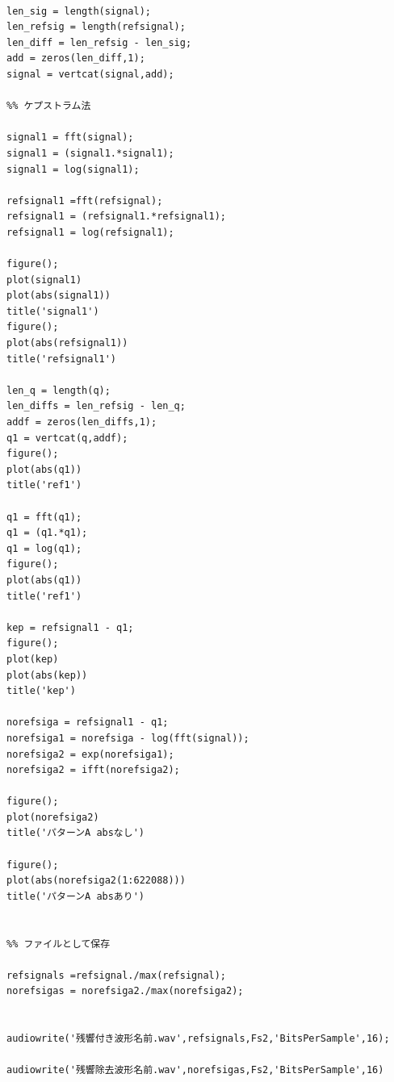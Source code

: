 \documentclass[a4j,11pt]{jsarticle}
\begin{document}
\begin{lstlisting}[caption=残響除去,label=fuga]
%% 波形の長さ揃える

len_sig = length(signal);
len_refsig = length(refsignal);
len_diff = len_refsig - len_sig;
add = zeros(len_diff,1);
signal = vertcat(signal,add);

%% ケプストラム法

signal1 = fft(signal);
signal1 = (signal1.*signal1);
signal1 = log(signal1);

refsignal1 =fft(refsignal);
refsignal1 = (refsignal1.*refsignal1);
refsignal1 = log(refsignal1);

figure();
plot(signal1)
plot(abs(signal1))
title('signal1')
figure();
plot(abs(refsignal1))
title('refsignal1')

len_q = length(q);
len_diffs = len_refsig - len_q;
addf = zeros(len_diffs,1);
q1 = vertcat(q,addf);
figure();
plot(abs(q1))
title('ref1')

q1 = fft(q1);
q1 = (q1.*q1);
q1 = log(q1);
figure();
plot(abs(q1))
title('ref1')

kep = refsignal1 - q1;
figure();
plot(kep)
plot(abs(kep))
title('kep')

norefsiga = refsignal1 - q1;
norefsiga1 = norefsiga - log(fft(signal));
norefsiga2 = exp(norefsiga1);
norefsiga2 = ifft(norefsiga2);

figure();
plot(norefsiga2)
title('パターンA absなし')

figure();
plot(abs(norefsiga2(1:622088)))
title('パターンA absあり')


%% ファイルとして保存

refsignals =refsignal./max(refsignal);
norefsigas = norefsiga2./max(norefsiga2);


audiowrite('残響付き波形名前.wav',refsignals,Fs2,'BitsPerSample',16);

audiowrite('残響除去波形名前.wav',norefsigas,Fs2,'BitsPerSample',16)

\end{lstlisting}
\newpage
\end{document}
